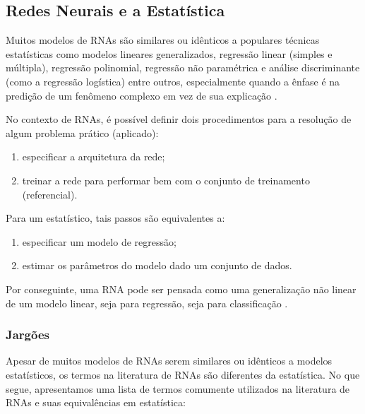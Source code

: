 \documentclass{automatextcc}
\begin{document}
\subsection{Redes Neurais e a Estatística}
Muitos modelos de RNAs são similares ou idênticos a populares técnicas estatísticas como modelos lineares generalizados, regressão linear (simples e múltipla), regressão polinomial, regressão não paramétrica e análise discriminante (como a regressão logística) entre outros, especialmente quando a ênfase é na predição de um fenômeno complexo em vez de sua explicação \citep{sarle1994, cheng1994}.

No contexto de RNAs, é possível definir dois procedimentos para a resolução de algum problema prático (aplicado):
\begin{enumerate}[label=(\roman*)]
  \item especificar a arquitetura da rede;
  \item treinar a rede para performar bem com o conjunto de treinamento (referencial).
\end{enumerate}
Para um estatístico, tais passos são equivalentes a: 
\begin{enumerate}[label=(\roman*)]
  \item especificar um modelo de regressão;
  \item estimar os parâmetros do modelo dado um conjunto de dados.
\end{enumerate}  
Por conseguinte, uma RNA pode ser pensada como uma generalização não linear de um modelo linear, seja para regressão, seja para classificação \citep{cheng1994, hastie2009}. 



\subsubsection{Jargões} 
Apesar de muitos modelos de RNAs serem similares ou idênticos a modelos estatísticos, os termos na literatura de RNAs são diferentes da estatística. No que segue, apresentamos uma lista de termos comumente utilizados na literatura de RNAs e suas equivalências em estatística:
\end{document}
